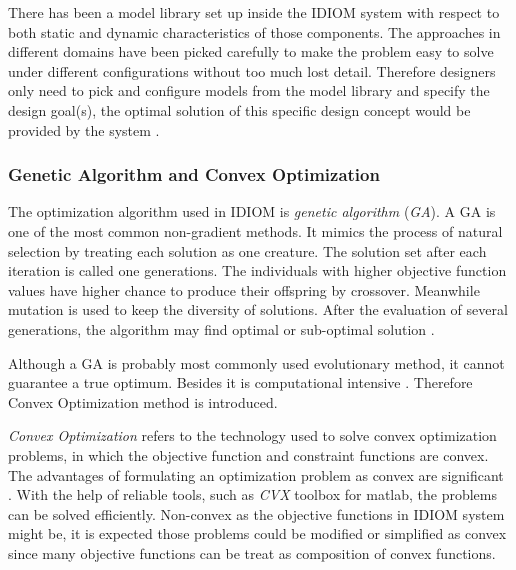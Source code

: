 There has been a model library set up inside the IDIOM system with respect to both static and dynamic characteristics of those components. The approaches in different domains have been picked carefully to make the problem easy to solve under different configurations without too much lost detail. Therefore designers only need to pick and configure models from the model library and specify the design goal(s), the optimal solution of this specific design concept would be provided by the system \cite{Holistic}. 

\subsubsection{Genetic Algorithm and Convex Optimization}

The optimization algorithm used in IDIOM is \textit{genetic algorithm} (\textit{GA}). A GA is one of the most common non-gradient methods. It mimics the process of natural selection by treating each solution as one creature. The solution set after each iteration  is called one generations. The individuals with higher objective function values have higher chance to produce their offspring by crossover. Meanwhile mutation is used to keep the diversity of solutions.  After the evaluation of several generations, the algorithm may find optimal or sub-optimal solution \cite{Nongradient}.

Although a GA is probably most commonly used evolutionary method, it cannot guarantee a true optimum. Besides it is computational intensive \cite{Roos}. Therefore Convex Optimization method is introduced.

\textit{Convex Optimization} refers to the technology used to solve convex optimization problems, in which the objective function and constraint functions are convex. The advantages of formulating an optimization problem as convex are significant \cite{Convex}. With the help of reliable tools, such as \textit{CVX} toolbox \cite{CVXtool} for matlab, the problems can be solved efficiently. Non-convex as the objective functions in IDIOM system might be, it is expected those problems could be modified or simplified as convex since many objective functions can be treat as composition of convex functions.

